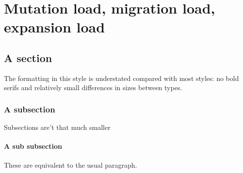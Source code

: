 \chapter{Mutation load, migration load, expansion load}
\label{chap:expansionload}

\section{A section}

The formatting in this style is understated compared with most styles:
no bold serifs and relatively small differences in sizes between types.

\subsection{A subsection}

Subsections are't that much smaller

\subsubsection{A sub subsection}

These are equivalent to the usual paragraph.


